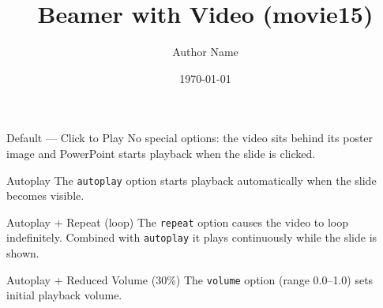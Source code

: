 \documentclass[aspectratio=169]{beamer}
\title{Beamer with Video (movie15)}
\author{Author Name}
\date{\today}
\begin{document}
\begin{frame}
    \titlepage
\end{frame}

\begin{frame}{Default --- Click to Play}
    No special options: the video sits behind its poster image and PowerPoint
    starts playback when the slide is clicked.
    \begin{center}
    \end{center}
\end{frame}

\begin{frame}{Autoplay}
    The \texttt{autoplay} option starts playback automatically when the slide
    becomes visible.
    \begin{center}
    \end{center}
\end{frame}

\begin{frame}{Autoplay + Repeat (loop)}
    The \texttt{repeat} option causes the video to loop indefinitely.
    Combined with \texttt{autoplay} it plays continuously while the slide is shown.
    \begin{center}
    \end{center}
\end{frame}



\begin{frame}{Autoplay + Reduced Volume (30\%)}
    The \texttt{volume} option (range 0.0--1.0) sets initial playback volume.
    \begin{center}
    \end{center}
\end{frame}
\end{document}
